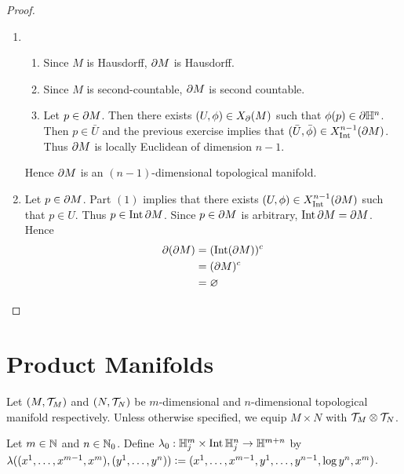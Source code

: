 \documentclass{book}
\begin{document}
\begin{proof}\
	\begin{enumerate}
		\item 
		\begin{enumerate}
			\item Since $M$ is Hausdorff, $\partial M$ is Hausdorff.
			\item Since $M$ is second-countable, $\partial M$ is second countable. 
			\item Let $p \in \partial M$. Then there exists $(U, \phi) \in X_{\partial}(M)$ such that $\phi(p) \in \partial \mathbb{H}^n$. Then $p \in \bar{U}$ and the previous exercise implies that $(\bar{U}, \bar{\phi}) \in X^{n-1}_{\operatorname{Int}}(\partial M)$. Thus $\partial M$ is locally Euclidean of dimension $n-1$.
		\end{enumerate}
		Hence $\partial M$ is an $(n-1)$-dimensional topological manifold.
		\item Let $p \in \partial M$. Part $(1)$ implies that there exists $(U, \phi) \in X^{n-1}_{\operatorname{Int}}(\partial M)$ such that $p \in U$. Thus $p \in \operatorname{Int} \partial M$. Since $p \in \partial M$ is arbitrary, $\operatorname{Int} \partial M = \partial M$. Hence 
		\begin{align*}
			\partial (\partial M)
			& = (\operatorname{Int}(\partial M))^c \\
			& = (\partial M)^c \\
			& = \varnothing
		\end{align*} 
	\end{enumerate}
\end{proof}

























\newpage
\section{Product Manifolds}

\begin{note} 
	Let $(M, \mathcal{T}_M)$ and $(N, \mathcal{T}_N)$ be $m$-dimensional and $n$-dimensional topological manifold respectively. Unless otherwise specified, we equip $M \times N$ with $\mathcal{T}_M \otimes \mathcal{T}_N$. 
\end{note}

\begin{defn} 
	Let $m \in \mathbb{N}$ and $n \in \mathbb{N}_0$. Define $\lambda_0: \mathbb{H}^m_j \times \operatorname{Int} \mathbb{H}^n_j \rightarrow \mathbb{H}^{m+n}$ by $\lambda((x^1, \ldots, x^{m-1}, x^m), (y^1, \ldots, y^n)) \vcentcolon= (x^1, \ldots, x^{m-1}, y^1, \ldots, y^{n-1}, \log y^n, x^m)$.  
\end{defn}
\end{document}
